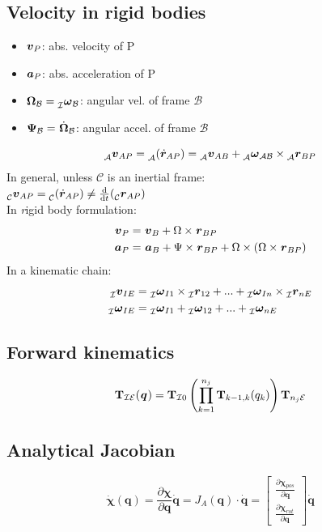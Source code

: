 \documentclass[a4paper, 8pt]{extarticle}
\newcommand{\mvec}[3]{  \prescript{}{\mathcal{#1}}{\bm{#2}}  _{#3} }
\newcommand{\mdvec}[3]{ \prescript{}{\mathcal{#1}}{\dot{\bm #2}} _{#3} }
\newcommand{\mrot}[2]{ \textbf{#1}_{ \mathcal{#2} } }
\begin{document}
\begin{multicols*}{3}
\subsection{Velocity in rigid bodies}
\begin{itemize}
\item $\mvec{}{v}{P}$: abs. velocity of P
\item $\mvec{}{a}{P}$: abs. acceleration of P
\item $\mvec{}{\Omega}{\mathcal{B}} = \mvec{I}{\omega}{\mathcal{B}}$: angular vel. of frame $\mathcal B$
\item $\mvec{}{\Psi}{\mathcal{B}} = \mdvec{}{\Omega}{\mathcal{B}}$: angular accel. of frame $\mathcal B$
\end{itemize}
\vspace{0.3em}
$$\mvec{A}{v}{AP} = \prescript{}{\mathcal{A}}{(\dot{\bm{r}}_{AP})} = \mvec{A}{v}{AB} + \mvec{A}{\omega}{\mathcal{AB}} \times \mvec{A}{r}{BP}$$
In general, unless $\mathcal C$ is an inertial frame:\\
$\mvec{C}{v}{AP} = \prescript{}{\mathcal{C}}{(\dot{\bm{r}}_{AP})} \neq \frac{\text d}{\text{d}t} (\mvec{C}{r}{AP})$\\
In {\textit rigid body formulation}:
\vspace{-0.9em}
\begin{align*}
\mvec{}{v}{P} &= \mvec{}{v}{B} + \Omega \times \mvec{}{r}{BP}\\
\mvec{}{a}{P} &= \mvec{}{a}{B} + \Psi\times\mvec{}{r}{BP} + \Omega \times (\Omega \times \mvec{}{r}{BP})
\end{align*}
In a kinematic chain:
\vspace{-0.9em}
\begin{align*}
\mkern-36mu\mvec{I}{v}{IE} &= \mvec{I}{\omega}{I1} \times \mvec{I}{r}{12} + ... + \mvec{I}{\omega}{In} \times \mvec{I}{r}{nE}\\
\mvec{I}{\omega}{IE} &= \mvec{I}{\omega}{I1} + \mvec{I}{\omega}{12} + ... + \mvec{I}{\omega}{nE}
\end{align*}



\subsection{Forward kinematics}
$$\mrot{T}{IE}(\mvec{}{q}{}) = \textbf{T}_{\mathcal I 0} \left(\prod_{k=1}^{n_j} \textbf{T}_{k-1,k}(q_k)\right) \textbf{T}_{n_j\mathcal E}$$



\subsection{Analytical Jacobian}
$$
\dot{\bm\chi}(\mathbf q) = \frac{\partial\bm\chi}{\partial \mathbf q}
\dot{\mathbf q} = J_{A}(\mathbf q)\cdot\dot{\mathbf{q}} = 
\begin{bmatrix} 
\frac{\partial\bm\chi_{pos}}{\partial \mathbf q} \\ \frac{\partial\bm\chi_{rot}}{\partial \mathbf q} \end{bmatrix} \dot{\mathbf{q}}$$




\end{multicols*}
\end{document}
